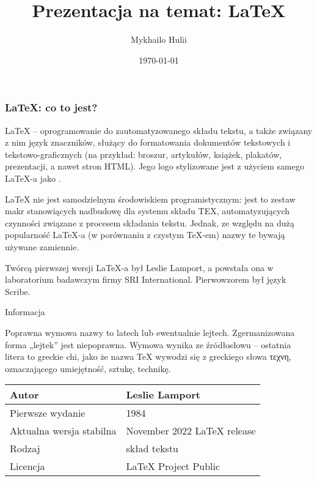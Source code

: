 \documentclass[mathserif]{beamer}
\title{Prezentacja na temat: LaTeX}
\author{Mykhailo Hulii}
\institute{Jana Długosza}
\date{\today}
\begin{document}
\frame{\titlepage}
    \begin{frame}
        \frametitle{LaTeX: co to jest?}
        LaTeX – oprogramowanie do zautomatyzowanego składu tekstu, a także związany z nim język znaczników, służący do formatowania dokumentów tekstowych i tekstowo-graficznych (na przykład: broszur, artykułów, książek, plakatów, prezentacji, a nawet stron HTML). Jego logo stylizowane jest z użyciem samego LaTeX-a jako {\displaystyle {} }.

LaTeX nie jest samodzielnym środowiskiem programistycznym: jest to zestaw makr stanowiących nadbudowę dla systemu składu TEX, automatyzujących czynności związane z procesem składania tekstu. Jednak, ze względu na dużą popularność LaTeX-a (w porównaniu z czystym TeX-em) nazwy te bywają używane zamiennie.

Twórcą pierwszej wersji LaTeX-a był Leslie Lamport, a powstała ona w laboratorium badawczym firmy SRI International. Pierwowzorem był język Scribe.
    \end{frame}
\begin{frame}{Informacja}
    \begin{scriptsize}
    Poprawna wymowa nazwy to latech lub ewentualnie lejtech. Zgermanizowana forma „lejtek” jest niepoprawna. Wymowa wynika ze źródłosłowu – ostatnia litera to greckie chi, jako że nazwa TeX wywodzi się z greckiego słowa τεχνη, oznaczającego umiejętność, sztukę, technikę.
    \end{scriptsize}
\vspace{0.5cm}
\begin{center}
\begin{tabular}{|p{2cm}|p{4cm}|}
\hline
Autor & Leslie Lamport\\
\hline
Pierwsze wydanie & 1984\\
\hline
Aktualna wersja stabilna & November 2022 LaTeX release\\
\hline
Rodzaj & skład tekstu\\
\hline
Licencja & LaTeX Project Public\\
\hline
\end{tabular}
\end{center}
\end{frame}
\end{document}

